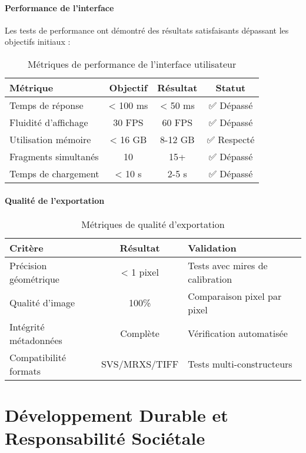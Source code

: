 \documentclass[12pt,a4paper]{report}
\let\oldchapter\chapter
\renewcommand{\chapter}{\clearpage\oldchapter}
\begin{document}
\begin{}
\begin{}
\begin{}
\begin{}
\subsubsection{Performance de l'interface}

Les tests de performance ont démontré des résultats satisfaisants dépassant les objectifs initiaux :

\begin{table}[H]
\centering
\begin{tabular}{|l|c|c|c|}
\hline
\textbf{Métrique} & \textbf{Objectif} & \textbf{Résultat} & \textbf{Statut} \\
\hline
Temps de réponse & < 100 ms & < 50 ms & ✅ Dépassé \\
\hline
Fluidité d'affichage & 30 FPS & 60 FPS & ✅ Dépassé \\
\hline
Utilisation mémoire & < 16 GB & 8-12 GB & ✅ Respecté \\
\hline
Fragments simultanés & 10 & 15+ & ✅ Dépassé \\
\hline
Temps de chargement & < 10 s & 2-5 s & ✅ Dépassé \\
\hline
\end{tabular}
\caption{Métriques de performance de l'interface utilisateur}
\label{tab:performance_interface}
\end{table}

\subsubsection{Qualité de l'exportation}

\begin{table}[H]
\centering
\begin{tabular}{|l|c|l|}
\hline
\textbf{Critère} & \textbf{Résultat} & \textbf{Validation} \\
\hline
Précision géométrique & < 1 pixel & Tests avec mires de calibration \\
\hline
Qualité d'image & 100\% & Comparaison pixel par pixel \\
\hline
Intégrité métadonnées & Complète & Vérification automatisée \\
\hline
Compatibilité formats & SVS/MRXS/TIFF & Tests multi-constructeurs \\
\hline
\end{tabular}
\caption{Métriques de qualité d'exportation}
\label{tab:qualite_export}
\end{table}


\chapter{Développement Durable et Responsabilité Sociétale}


\end{}
\end{}
\end{}
\end{}
\end{document}
